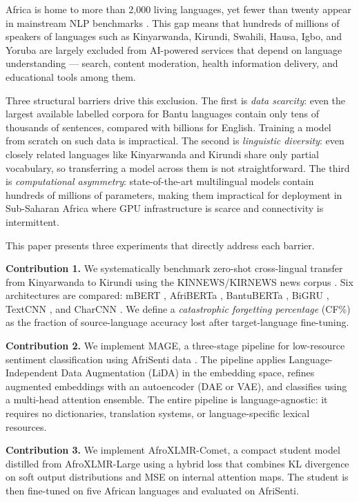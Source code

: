 \documentclass[conference]{IEEEtran}
\begin{document}
Africa is home to more than 2,000 living languages, yet fewer than twenty
appear in mainstream NLP benchmarks \cite{b_adelani_afrisenti}.
This gap means that hundreds of millions of speakers of languages such as
Kinyarwanda, Kirundi, Swahili, Hausa, Igbo, and Yoruba are largely
excluded from AI-powered services that depend on language understanding ---
search, content moderation, health information delivery, and educational
tools among them.

Three structural barriers drive this exclusion.
The first is \emph{data scarcity}: even the largest available labelled
corpora for Bantu languages contain only tens of thousands of sentences,
compared with billions for English.
Training a model from scratch on such data is impractical.
The second is \emph{linguistic diversity}: even closely related languages
like Kinyarwanda and Kirundi share only partial vocabulary, so transferring
a model across them is not straightforward.
The third is \emph{computational asymmetry}: state-of-the-art multilingual
models contain hundreds of millions of parameters, making them impractical
for deployment in Sub-Saharan Africa where GPU infrastructure is scarce
and connectivity is intermittent.

This paper presents three experiments that directly address each barrier.

\textbf{Contribution 1.}
We systematically benchmark zero-shot cross-lingual transfer from
Kinyarwanda to Kirundi using the KINNEWS/KIRNEWS news corpus \cite{b_kinnews}.
Six architectures are compared: mBERT \cite{b_devlin}, AfriBERTa
\cite{b_ogueji}, BantuBERTa \cite{b_dossou}, BiGRU \cite{b_cho},
TextCNN \cite{b_kim}, and CharCNN \cite{b_zhang}. We define a
\emph{catastrophic forgetting percentage} (CF\%) as the fraction of
source-language accuracy lost after target-language fine-tuning.

\textbf{Contribution 2.}
We implement MAGE, a three-stage pipeline for low-resource sentiment
classification using AfriSenti data \cite{b_adelani_afrisenti}.
The pipeline applies Language-Independent Data Augmentation (LiDA) in
the embedding space, refines augmented embeddings with an autoencoder
(DAE or VAE), and classifies using a multi-head attention ensemble.
The entire pipeline is language-agnostic: it requires no dictionaries,
translation systems, or language-specific lexical resources.

\textbf{Contribution 3.}
We implement AfroXLMR-Comet, a compact student model distilled from
AfroXLMR-Large \cite{b_alabi} using a hybrid loss that combines KL
divergence on soft output distributions and MSE on internal attention maps.
The student is then fine-tuned on five African languages and evaluated
on AfriSenti.
\end{document}
